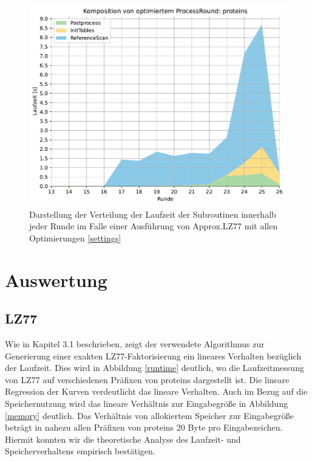 \begin{figure}[ht]
    \centering
    \caption{Darstellung der Verteilung der Laufzeit der Subroutinen innerhalb jeder Runde im Falle einer Ausführung von Approx.LZ77 mit allen Optimierungen \ref{settings}}
    \label{opt}
    \includegraphics[scale=0.6]{Images/progressive_opt_stack.pdf}
\end{figure}

\section{Auswertung}
\subsection{LZ77}
Wie in Kapitel 3.1 beschrieben, zeigt der verwendete Algorithmus zur Generierung einer exakten LZ77-Faktorisierung ein lineares Verhalten bezüglich der Laufzeit.
Dies wird in Abbildung \ref{runtime} deutlich, wo die Laufzeitmessung von LZ77 auf verschiedenen Präfixen von proteins dargestellt ist. Die lineare Regression der
Kurven verdeutlicht das lineare Verhalten. Auch im Bezug auf die Speichernutzung wird das lineare Verhältnis zur Eingabegröße in Abbildung \ref{memory} deutlich.
Das Verhältnis von allokiertem Speicher zur Eingabegröße beträgt in nahezu allen Präfixen von proteins 20 Byte pro Eingabezeichen. Hiermit konnten wir die theoretische
Analyse des Laufzeit- und Speicherverhaltens empirisch bestätigen.

